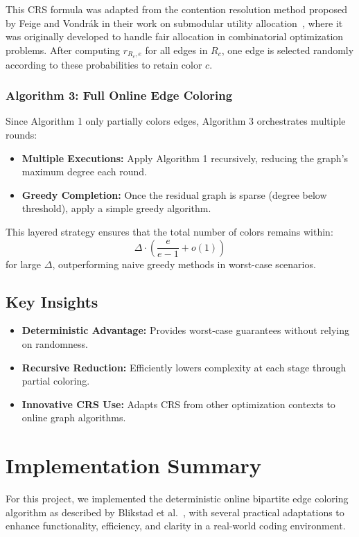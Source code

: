 \documentclass[11pt]{article}
\begin{document}
This CRS formula was adapted from the contention resolution method proposed by Feige and Vondrák in their work on submodular utility allocation~\cite{feige2006}, where it was originally developed to handle fair allocation in combinatorial optimization problems. After computing $r_{R_c, e}$ for all edges in $R_c$, one edge is selected randomly according to these probabilities to retain color $c$.

\subsubsection*{Algorithm 3: Full Online Edge Coloring}
Since Algorithm 1 only partially colors edges, Algorithm 3 orchestrates multiple rounds:

\begin{itemize}
    \item \textbf{Multiple Executions:} Apply Algorithm 1 recursively, reducing the graph's maximum degree each round.
    \item \textbf{Greedy Completion:} Once the residual graph is sparse (degree below threshold), apply a simple greedy algorithm.
\end{itemize}

This layered strategy ensures that the total number of colors remains within:
\[
\Delta \cdot \left( \frac{e}{e - 1} + o(1) \right)
\]
for large $\Delta$, outperforming naive greedy methods in worst-case scenarios.

\subsection*{Key Insights}
\begin{itemize}
    \item \textbf{Deterministic Advantage:} Provides worst-case guarantees without relying on randomness.
    \item \textbf{Recursive Reduction:} Efficiently lowers complexity at each stage through partial coloring.
    \item \textbf{Innovative CRS Use:} Adapts CRS from other optimization contexts to online graph algorithms.
\end{itemize}

\section{Implementation Summary}

For this project, we implemented the deterministic online bipartite edge coloring algorithm as described by Blikstad et al.~\cite{blikstad2024}, with several practical adaptations to enhance functionality, efficiency, and clarity in a real-world coding environment.
\end{document}
